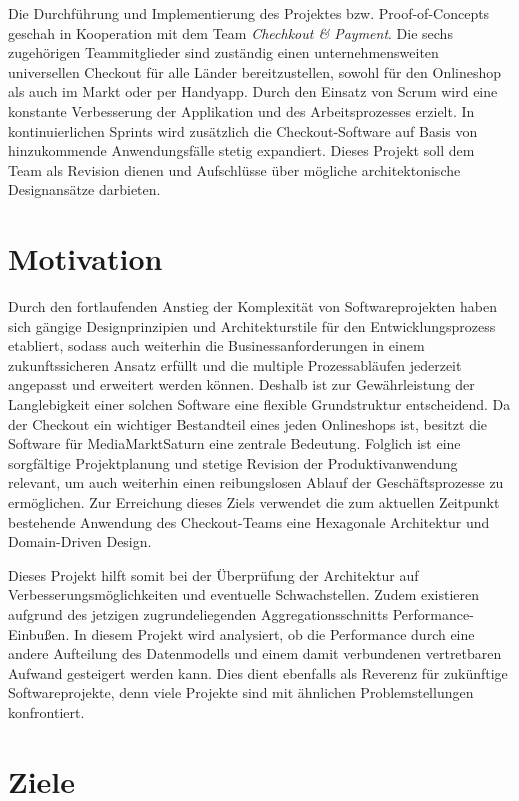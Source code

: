 Die Durchführung und Implementierung des Projektes bzw. Proof-of-Concepts geschah in Kooperation mit dem Team \emph{Chechkout \& Payment}. Die sechs zugehörigen Teammitglieder sind zuständig einen unternehmensweiten universellen Checkout für alle Länder bereitzustellen, sowohl für den Onlineshop als auch im Markt oder per Handyapp. Durch den Einsatz von \Gls{Scrum} wird eine konstante Verbesserung der Applikation und des Arbeitsprozesses erzielt. In kontinuierlichen \Glspl{Sprint} wird zusätzlich die Checkout-Software auf Basis von hinzukommende Anwendungsfälle stetig expandiert. Dieses Projekt soll dem Team als Revision dienen und Aufschlüsse über mögliche architektonische Designansätze darbieten.


\section{Motivation}


Durch den fortlaufenden Anstieg der Komplexität von Softwareprojekten haben sich gängige Designprinzipien und Architekturstile für den Entwicklungsprozess etabliert, sodass auch weiterhin die Businessanforderungen in einem zukunftssicheren Ansatz erfüllt und die multiple Prozessabläufen jederzeit angepasst und erweitert werden können. Deshalb ist zur Gewährleistung der Langlebigkeit einer solchen Software eine flexible Grundstruktur entscheidend. Da der Checkout ein wichtiger Bestandteil eines jeden Onlineshops ist, besitzt die Software für MediaMarktSaturn eine zentrale Bedeutung. Folglich ist eine sorgfältige Projektplanung und stetige Revision der Produktivanwendung relevant, um auch weiterhin einen reibungslosen Ablauf der Geschäftsprozesse zu ermöglichen. Zur Erreichung dieses Ziels verwendet die zum aktuellen Zeitpunkt bestehende Anwendung des Checkout-Teams eine Hexagonale Architektur und Domain-Driven Design.

Dieses Projekt hilft somit bei der Überprüfung der Architektur auf Verbesserungsmöglichkeiten und eventuelle Schwachstellen. Zudem existieren aufgrund des jetzigen zugrundeliegenden Aggregationsschnitts Performance-Einbußen. In diesem Projekt wird analysiert, ob die Performance durch eine andere Aufteilung des Datenmodells und einem damit verbundenen vertretbaren Aufwand gesteigert werden kann. Dies dient ebenfalls als Reverenz für zukünftige Softwareprojekte, denn viele Projekte sind mit ähnlichen Problemstellungen konfrontiert.



\section{Ziele}

